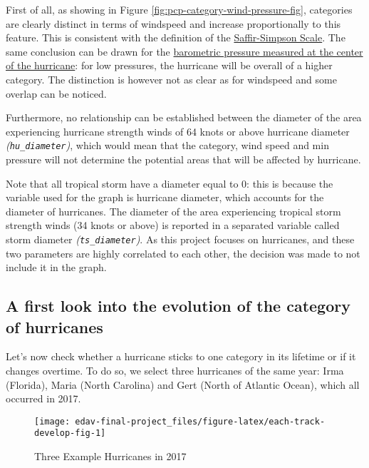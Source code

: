 \documentclass[]{book}
\begin{document}
First of all, as showing in Figure \ref{fig:pcp-category-wind-pressure-fig}, categories are clearly distinct in terms of windspeed and increase proportionally to this feature. This is consistent with the definition of the \href{https://www.nhc.noaa.gov/aboutsshws.php}{Saffir-Simpson Scale}. The same conclusion can be drawn for the \href{https://sciencing.com/barometric-pressure-hurricanes-22734.html}{barometric pressure measured at the center of the hurricane}: for low pressures, the hurricane will be overall of a higher category. The distinction is however not as clear as for windspeed and some overlap can be noticed.

Furthermore, no relationship can be established between the diameter of the area experiencing hurricane strength winds of 64 knots or above hurricane diameter \emph{(\texttt{hu\_diameter})}, which would mean that the category, wind speed and min pressure will not determine the potential areas that will be affected by hurricane.

Note that all tropical storm have a diameter equal to 0: this is because the variable used for the graph is hurricane diameter, which accounts for the diameter of hurricanes. The diameter of the area experiencing tropical storm strength winds (34 knots or above) is reported in a separated variable called storm diameter \emph{(\texttt{ts\_diameter})}. As this project focuses on hurricanes, and these two parameters are highly correlated to each other, the decision was made to not include it in the graph.

\hypertarget{a-first-look-into-the-evolution-of-the-category-of-hurricanes}{%
\subsection{A first look into the evolution of the category of hurricanes}\label{a-first-look-into-the-evolution-of-the-category-of-hurricanes}}

Let's now check whether a hurricane sticks to one category in its lifetime or if it changes overtime. To do so, we select three hurricanes of the same year: Irma (Florida), Maria (North Carolina) and Gert (North of Atlantic Ocean), which all occurred in 2017.

\begin{figure}

{\centering \texttt{[image: edav-final-project\_files/figure-latex/each-track-develop-fig-1]} 

}

\caption{Three Example Hurricanes in 2017}\label{fig:each-track-develop-fig}
\end{figure}
\end{document}
